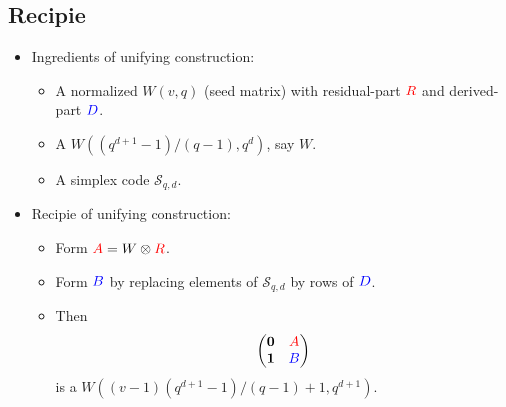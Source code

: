 \documentclass{beamer}
\newcommand{\RR}[1]{\textcolor{red}{#1}}
\newcommand{\BB}[1]{\textcolor{blue}{#1}}
\begin{document}

\subsection{Recipie}

\begin{frame}

  \begin{itemize}
  \item Ingredients of unifying construction:
    \begin{itemize} 
    \item A normalized $W(v,q)$ (seed matrix) with residual-part $\RR{R}$ and
      derived-part $\BB{D}$.
    \item A $W((q^{d+1}-1)/(q-1),q^d)$, say $W$.
    \item A simplex code $\mathcal{S}_{q,d}$.
    \end{itemize}
  \end{itemize}
  
\end{frame}

\begin{frame}

  \begin{itemize}
  \item Recipie of unifying construction:
    \begin{itemize}
    \item Form $\RR{A} = W \otimes \RR{R}$.
    \item Form $\BB{B}$ by replacing elements of $\mathcal{S}_{q,d}$ by rows of
      $\BB{D}$. 
    \item Then
      \[
        \begin{pmatrix}
          \textbf{0} & \RR{A} \\
          \textbf{1} & \BB{B}
        \end{pmatrix}
      \]
      is a $W((v-1)(q^{d+1}-1)/(q-1)+1,q^{d+1})$.
    \end{itemize}
  \end{itemize}
  
\end{frame}
\end{document}
